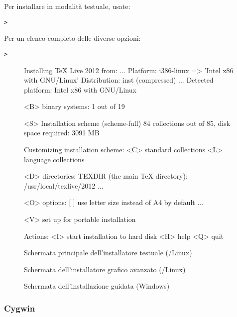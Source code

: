 \documentclass{article}
\begin{document}
Per installare in modalità testuale, usate:
\begin{alltt}
> 
\end{alltt}

Per un elenco completo delle diverse opzioni:
\begin{alltt}
> 
\end{alltt}

\begin{figure}[tb]
\begin{boxedverbatim}
Installing TeX Live 2012 from: ...
Platform: i386-linux => 'Intel x86 with GNU/Linux'
Distribution: inst (compressed)
...
 Detected platform: Intel x86 with GNU/Linux

 <B> binary systems: 1 out of 19

 <S> Installation scheme (scheme-full)
     84 collections out of 85, disk space required: 3091 MB

 Customizing installation scheme:
   <C> standard collections
   <L> language collections

 <D> directories:
   TEXDIR (the main TeX directory):
     /usr/local/texlive/2012
   ...

 <O> options:
   [ ] use letter size instead of A4 by default
   ...

 <V> set up for portable installation

Actions:
 <I> start installation to hard disk
 <H> help
 <Q> quit
\end{boxedverbatim}
\caption{Schermata principale dell'installatore testuale
  (\GNU/Linux)}\label{fig:text-main}
\end{figure}

\begin{figure}[tb]
\caption{Schermata dell'installatore grafico avanzato
  (\GNU/Linux)}\label{fig:gui-main}
\end{figure}

\begin{figure}[tb]
\caption{Schermata dell'installazione guidata
  (Windows)}\label{fig:wizard-w32}
\end{figure}


\subsubsection{Cygwin}
\label{sec:cygwin}
\end{document}
